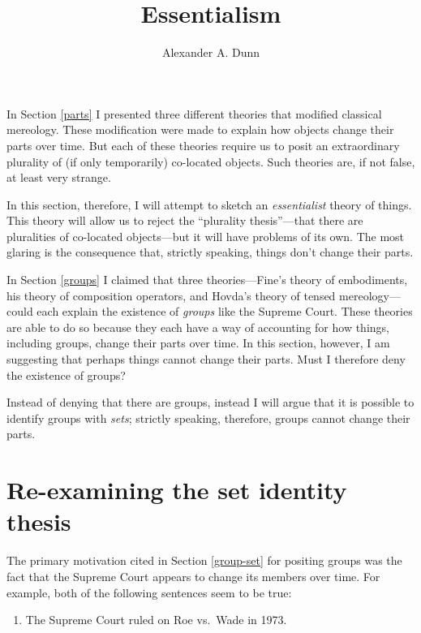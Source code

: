 \documentclass[11pt]{article}
\title{Essentialism}
\author{Alexander A. Dunn}
\begin{document}
\ifstandalone
\maketitle
\begin{spacing}{1.5}
\fi

\label{essential}

In Section \ref{parts} I presented three different theories that
modified classical mereology.  These modification were made to explain
how objects change their parts over time.  But each of these theories
require us to posit an extraordinary plurality of (if only
temporarily) co-located objects.  Such theories are, if not false, at
least very strange.

In this section, therefore, I will attempt to sketch an {\em
  essentialist} theory of things.  This theory will allow us to reject
the ``plurality thesis''---that there are pluralities of co-located
objects---but it will have problems of its own.  The most glaring is
the consequence that, strictly speaking, things don't change their
parts.

In Section \ref{groups} I claimed that three theories---Fine's theory
of embodiments, his theory of composition operators, and Hovda's
theory of tensed mereology---could each explain the existence of {\em
  groups} like the Supreme Court.  These theories are able to do so
because they each have a way of accounting for how things, including
groups, change their parts over time.  In this section, however, I am
suggesting that perhaps things cannot change their parts.  Must I
therefore deny the existence of groups?

Instead of denying that there are groups, instead I will argue that it
is possible to identify groups with {\em sets}; strictly speaking,
therefore, groups cannot change their parts.

\section{Re-examining the set identity thesis}
\label{set-id}
The primary motivation cited in Section \ref{group-set} for positing
groups was the fact that the Supreme Court appears to change its
members over time.  For example, both of the following sentences seem
to be true:

\begin{enumerate}[ref=(\arabic*)]
  \item The Supreme Court ruled on Roe vs.\ Wade in 1973. \label{roe1}


\end{enumerate}
\end{spacing}
\end{document}
